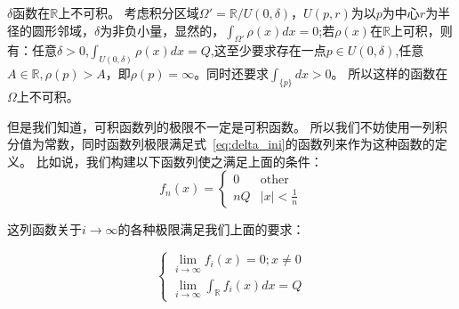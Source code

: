 \documentclass[lang=cn,10pt,newtx,bibend=biber,device=pad]{elegantbook}
\begin{document}
\begin{lemma}[不可积性]
    $\delta$函数在$\mathbb{R}$上不可积。
    考虑积分区域$\Omega' = \mathbb{R}/U(0,\delta)$，$U(p,r)$为以$p$为中心$r$为半径的圆形邻域，$\delta$为非负小量，显然的，$\int_{\Omega'}\rho(x)dx= 0$;若$\rho(x)$在$\mathbb{R}$上可积，则有：任意$\delta>0$,$\int_{U(0,\delta)}\rho(x)dx=Q$,这至少要求存在一点$p\in U(0,\delta)$,任意$A \in \mathbb{R},\rho(p)>A$，即$\rho(p)= \infty$。同时还要求$\int_{\{p\}} dx > 0$。
    所以这样的函数在$\Omega$上不可积。
\end{lemma}
但是我们知道，可积函数列的极限不一定是可积函数。
所以我们不妨使用一列积分值为常数，同时函数列极限满足式~\ref{eq:delta_ini}的函数列来作为这种函数的定义。
比如说，我们构建以下函数列使之满足上面的条件：
\begin{equation}
    f_n(x) =  \begin{cases} 0 &\text{other}\\ nQ &\text{$|x|<\frac{1}{n}$}  \end{cases}
\end{equation}

这列函数关于$i\rightarrow \infty$的各种极限满足我们上面的要求：

\begin{equation}
\begin{cases}
\lim_{i\rightarrow\infty}f_i(x)=0;x\neq0\\
\lim_{i\rightarrow\infty}\int_{\mathbb{R}}f_i(x)dx = Q
\end{cases}
\end{equation}
\end{document}
